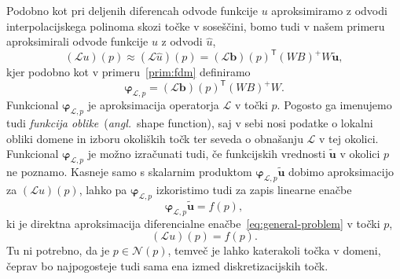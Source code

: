 \documentclass[12pt,a4paper,twoside]{article}
\theoremstyle{definition} %
\theoremstyle{plain} %
\numberwithin{equation}{section}
\newcommand{\Nc}{\mathcal{N}}
\renewcommand{\L}{\mathcal{L}}
\newcommand{\T}{\mathsf{T}}
\renewcommand{\b}{\boldsymbol}
\renewcommand{\phi}{\varphi}
\newcommand{\uh}{\hat{u}}
\newcommand{\ang}[1]{(\hspace{-1.5px}\textit{angl.}\ #1)}
\begin{document}
Podobno kot pri deljenih diferencah odvode funkcije $u$ aproksimiramo z odvodi
interpolacijskega polinoma skozi točke v soseščini, bomo tudi v našem primeru
aproksimirali odvode funkcije $u$ z odvodi $\uh$,
\begin{equation}
  (\L u)(p) \approx (\L \uh)(p) = (\L\b{b})(p)^\T(WB)^{+}W \b{\tilde{u}},
\end{equation}
kjer podobno kot v primeru~\ref{prim:fdm} definiramo
\begin{equation}
  \b\phi_{\L, p} = (\L\b{b})(p)^\T(WB)^{+}W.
  \label{eq:shape-definition}
\end{equation}
Funkcional $\b\phi_{\L, p}$ je aproksimacija operatorja $\L$ v točki $p$. Pogosto ga imenujemo
tudi \emph{funkcija oblike}~\ang{shape function}, saj v sebi nosi podatke o lokalni obliki domene in
izboru okoliških točk ter seveda o obnašanju $\L$ v tej okolici. Funkcional $\b\phi_{\L, p}$ je
možno izračunati tudi, če funkcijskih vrednosti $\b{\tilde{u}}$ v okolici $p$ ne poznamo. Kasneje samo s
skalarnim produktom $\b\phi_{\L, p} \b{\tilde{u}}$ dobimo aproksimacijo za $(\L u)(p)$, lahko pa
$\b\phi_{\L, p}$ izkoristimo tudi za zapis linearne enačbe
\begin{equation}
  \b\phi_{\L, p} \b{\tilde{u}} = f(p),
\end{equation}
ki je direktna aproksimacija diferencialne enačbe~\eqref{eq:general-problem} v točki $p$,
\begin{equation}
  \label{eq:discrete-approx-in-one-point}
   (\L u)(p) = f(p).
\end{equation}
Tu ni potrebno, da je $p \in \Nc(p)$, temveč je lahko katerakoli točka v domeni, čeprav bo
najpogosteje tudi sama ena izmed diskretizacijskih točk.
\end{document}
